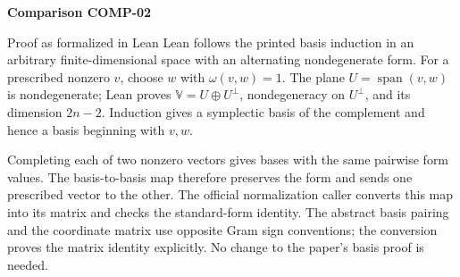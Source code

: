 \documentclass[11pt]{amsart}
\numberwithin{equation}{section}
\theoremstyle{plain}
\theoremstyle{remark}
\begin{document}
\par\bigskip\noindent{}\hypertarget{comparison-COMP-02}{\textbf{Comparison COMP-02}}\label{comparison-COMP-02}\par\smallskip
{}
\begin{AIaddition}{Proof as formalized in Lean}
Lean follows the printed basis induction in an arbitrary finite-dimensional
space with an alternating nondegenerate form. For a prescribed nonzero $v$,
choose $w$ with $\omega(v,w)=1$. The plane $U=\operatorname{span}(v,w)$
is nondegenerate; Lean proves $\mathbb V=U\oplus U^\perp$, nondegeneracy
on $U^\perp$, and its dimension $2n-2$. Induction gives a symplectic basis
of the complement and hence a basis beginning with $v,w$.

Completing each of two nonzero vectors gives bases with the same pairwise
form values. The basis-to-basis map therefore preserves the form and sends
one prescribed vector to the other. The official normalization caller
converts this map into its matrix and checks the standard-form identity.
The abstract basis pairing and the coordinate matrix use opposite Gram
sign conventions; the conversion proves the matrix identity explicitly.
No change to the paper's basis proof is needed.
\end{AIaddition}
\end{document}
